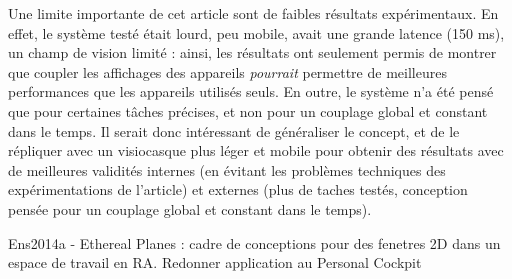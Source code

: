 Une limite importante de cet article sont de faibles résultats expérimentaux. En effet, le système testé était lourd, peu mobile, avait une grande latence (150 ms), un champ de vision limité : ainsi, les résultats ont seulement permis de montrer que coupler les affichages des appareils \emph{pourrait} permettre de meilleures performances que les appareils utilisés seuls. En outre, le système n'a été pensé que pour certaines tâches précises, et non pour un couplage global et constant dans le temps. Il serait donc intéressant de généraliser le concept, et de le répliquer avec un visiocasque plus léger et mobile pour obtenir des résultats avec de meilleures validités internes (en évitant les problèmes techniques des expérimentations de l'article) et externes (plus de taches testés, conception pensée pour un couplage global et constant dans le temps).


Ens2014a - Ethereal Planes : cadre de conceptions pour des fenetres 2D dans un espace de travail en RA. Redonner application au Personal Cockpit

